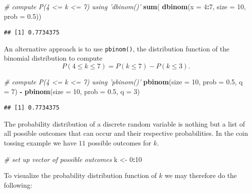 \documentclass[]{book}
\newenvironment{Shaded}{\begin{snugshade}}{\end{snugshade}}
\newcommand{\KeywordTok}[1]{\textcolor[rgb]{0.13,0.29,0.53}{\textbf{#1}}}
\newcommand{\DataTypeTok}[1]{\textcolor[rgb]{0.13,0.29,0.53}{#1}}
\newcommand{\DecValTok}[1]{\textcolor[rgb]{0.00,0.00,0.81}{#1}}
\newcommand{\FloatTok}[1]{\textcolor[rgb]{0.00,0.00,0.81}{#1}}
\newcommand{\StringTok}[1]{\textcolor[rgb]{0.31,0.60,0.02}{#1}}
\newcommand{\CommentTok}[1]{\textcolor[rgb]{0.56,0.35,0.01}{\textit{#1}}}
\newcommand{\OperatorTok}[1]{\textcolor[rgb]{0.81,0.36,0.00}{\textbf{#1}}}
\newcommand{\NormalTok}[1]{#1}
\theoremstyle{definition}
\theoremstyle{definition}
\theoremstyle{definition}
\theoremstyle{remark}
\begin{document}
\begin{Shaded}
\begin{Highlighting}[]
\CommentTok{# compute P(4 <= k <= 7) using 'dbinom()'}
\KeywordTok{sum}\NormalTok{(}
  \KeywordTok{dbinom}\NormalTok{(}\DataTypeTok{x =} \DecValTok{4}\OperatorTok{:}\DecValTok{7}\NormalTok{, }
         \DataTypeTok{size =} \DecValTok{10}\NormalTok{, }
         \DataTypeTok{prob =} \FloatTok{0.5}\NormalTok{))}
\end{Highlighting}
\end{Shaded}

\begin{verbatim}
## [1] 0.7734375
\end{verbatim}

An alternative approach is to use \texttt{pbinom()}, the distribution
function of the binomial distribution to compute
\[P(4 \leq k \leq 7) = P(k \leq 7) - P(k\leq3 ).\]

\begin{Shaded}
\begin{Highlighting}[]
\CommentTok{# compute P(4 <= k <= 7) using 'pbinom()'}
\KeywordTok{pbinom}\NormalTok{(}\DataTypeTok{size =} \DecValTok{10}\NormalTok{, }\DataTypeTok{prob =} \FloatTok{0.5}\NormalTok{, }\DataTypeTok{q =} \DecValTok{7}\NormalTok{) }\OperatorTok{-}\StringTok{ }\KeywordTok{pbinom}\NormalTok{(}\DataTypeTok{size =} \DecValTok{10}\NormalTok{, }\DataTypeTok{prob =} \FloatTok{0.5}\NormalTok{, }\DataTypeTok{q =} \DecValTok{3}\NormalTok{) }
\end{Highlighting}
\end{Shaded}

\begin{verbatim}
## [1] 0.7734375
\end{verbatim}

The probability distribution of a discrete random variable is nothing
but a list of all possible outcomes that can occur and their respective
probabilities. In the coin tossing example we have \(11\) possible
outcomes for \(k\).

\begin{Shaded}
\begin{Highlighting}[]
\CommentTok{# set up vector of possible outcomes}
\NormalTok{k <-}\StringTok{ }\DecValTok{0}\OperatorTok{:}\DecValTok{10}
\end{Highlighting}
\end{Shaded}

To visualize the probability distribution function of \(k\) we may
therefore do the following:
\end{document}
